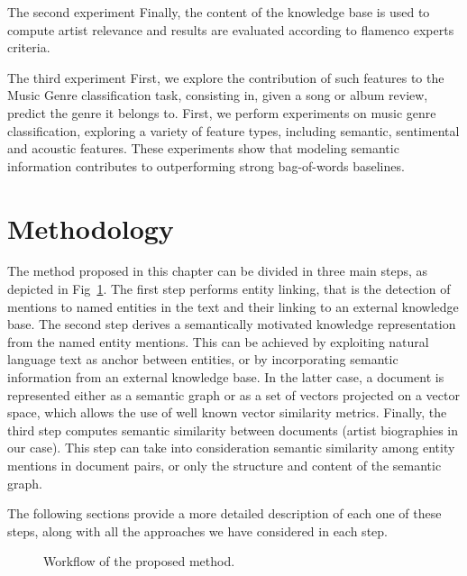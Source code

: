 The second experiment
Finally, the content of the knowledge base is used to compute artist relevance and results are evaluated according to flamenco experts criteria.

The third experiment
First, we explore the contribution of such features to the Music Genre classification task, consisting in, given a song or album review, predict the genre it belongs to.
First, we perform experiments on music genre classification, exploring a variety of feature types, including semantic, sentimental and acoustic features. These experiments show that modeling semantic information contributes to outperforming strong bag-of-words baselines. 


\section{Methodology} %
\label{sec:similarity:methodology}

The method proposed in this chapter %
can be divided in three main steps, as depicted in Fig~\ref{fig:similarity:methodology}.
The first step performs entity linking, that is the detection of mentions to named entities in the text and their linking to an external knowledge base.
The second step derives a semantically motivated knowledge representation from the named entity mentions. This can be achieved by exploiting natural language text as anchor between entities, or by incorporating semantic information from an external knowledge base. In the latter case, a document is represented either as a semantic graph or as a set of vectors projected on a vector space, which allows the use of well known vector similarity metrics.
Finally, the third step computes semantic similarity between documents (artist biographies in our case). This step can take into consideration semantic similarity among entity mentions in document pairs, or only the structure and content of the semantic graph.

The following sections provide a more detailed description of each one of these steps, along with all the approaches we have considered in each step.

\begin{figure}[!htp]
\centerline{}
\caption{Workflow of the proposed method.}
\label{fig:similarity:methodology}
\end{figure}

